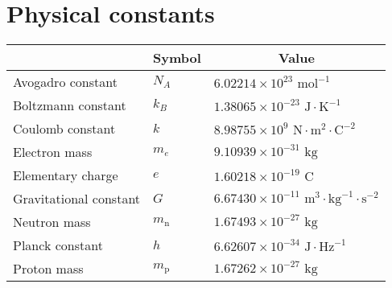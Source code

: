 \documentclass[../main_physics.tex]{subfiles}
\begin{document}
\renewcommand{\col}{\phy}
\section*{Physical constants}
\begin{center}
  \begin{tabular}{|l|l|l|}
    \hline
    \rowcolor{\phy!50}
    \multicolumn{1}{|c|}{\bfseries Quantity} & \multicolumn{1}{c|}{\bfseries Symbol} & \multicolumn{1}{c|}{\bfseries Value}                                     \\
    \hline
    \hline
    Avogadro constant                        & $N_A$                                 & $6.02214\times 10^{23}\text{ mol}^{-1}$                                  \\
    \hline
    Boltzmann constant                       & $k_B$                                 & $1.38065\times 10^{-23}\text{ J}\cdot\text{K}^{-1}$                      \\
    \hline
    Coulomb constant                         & $k$                                   & $8.98755\times 10^9\text{ N}\cdot\text{m}^2\cdot\text{C}^{-2}$           \\
    \hline
    Electron mass                            & $m_e$                                 & $9.10939\times 10^{-31}\text{ kg}$                                       \\
    \hline
    Elementary charge                        & $e$                                   & $1.60218\times 10^{-19}\text{ C}$                                        \\
    \hline
    Gravitational constant                   & $G$                                   & $6.67430\times 10^{-11}\text{ m}^3\cdot\text{kg}^{-1}\cdot\text{s}^{-2}$ \\
    \hline
    Neutron mass                             & $m_\text{n}$                          & $1.67493\times 10^{-27}\text{ kg}$                                       \\
    \hline
    Planck constant                          & $h$                                   & $6.62607\times 10^{-34}\text{ J}\cdot\text{Hz}^{-1}$                     \\
    \hline
    Proton mass                              & $m_\text{p}$                          & $1.67262\times 10^{-27}\text{ kg}$                                       \\

\end{tabular}
\end{center}
\end{document}

